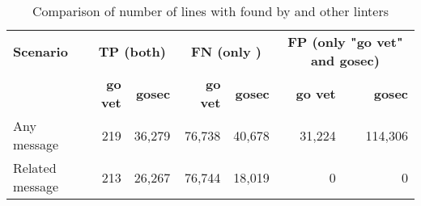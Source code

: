 \begin{table}[htp!]
    \centering
    \caption{Comparison of number of lines with \unsafe{} found by \toolGeiger{} and other linters}
    \label{tbl:go-geiger-evaluation-linters}
    \begin{tabular}{l|rr|rr|rr}
        \textbf{Scenario} & \multicolumn{2}{c|}{\textbf{TP (both)}} & \multicolumn{2}{c|}{\textbf{FN (only \toolGeiger{})}} & \multicolumn{2}{c}{\textbf{FP (only "go vet" and gosec)}} \\
        {}                & \textbf{go vet} & \textbf{gosec}        & \textbf{go vet} & \textbf{gosec}                      & \textbf{go vet} & \textbf{gosec}              \\
        \hline
        Any message       & 219             & 36,279                & 76,738          & 40,678                              &  31,224         & 114,306                     \\
        Related message   & 213             & 26,267                & 76,744          & 18,019                              &       0         & 0                           \\
    \end{tabular}
\end{table}